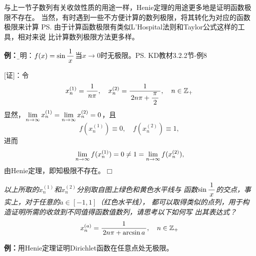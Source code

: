 与上一节子数列有关收敛性质的用途一样，Henie定理的用途更多地是证明函数极限不存在。
当然，有时遇到一些不方便计算的数列极限，将其转化为对应的函数极限来计算
\ps{由于计算函数极限有类似L'Hospital法则和Taylor公式这样的工具，相对来说
比计算数列极限方法更多样}。

{\bf 例：}{\b 证明：$f(x)=\sin\displaystyle\frac{\,{1}\,}{\,{x}\,}$当$x\to 0$时无极限。}\ps{KD教材3.2.2节-例8}

[证]：令
$$x^{(1)}_n=\displaystyle\frac{\,{1}\,}{\,{n\pi}\,},\quad
x^{(2)}_n=\displaystyle\frac{\,{1}\,}{\,{2n\pi+\displaystyle\frac{\,{\pi}\,}{\,{2}\,}}\,},\quad n\in\mathbb{Z}_+$$ 
显然，$\lim\limits_{n\to\infty} x^{(1)}_n=\lim\limits_{n\to\infty} x^{(2)}_n=0$，且
$$f(x^{(1)}_n)\equiv0,\quad f(x^{(2)}_n)\equiv1,$$
进而
$$\lim\limits_{n\to\infty} f(x^{(1)}_n)=0\ne1=\lim\limits_{n\to\infty} f(x^{(2)}_n),$$
由Henie定理，即知极限不存在。\hfill $\Box$

\begin{center}
	
	{\it 以上所取的$x^{(1)}_n$和$x^{(2)}_n$分别取自图上绿色和黄色水平线与
	函数$\sin\displaystyle\frac{\,{1}\,}{\,{x}\,}$的交点，事实上，对于任意的$a\in[-1,1]$（红色水平线），
	都可以取得类似的点列，用于构造证明所需的收敛到不同值得函数值数列，请思考以下如何写
	出其表达式？
	$$x^{(a)}_n=\displaystyle\frac{\,{1}\,}{\,{2n\pi+\arcsin a}\,},\quad n\in\mathbb{Z}_+$$}
\end{center}

	{\bf 例：}用Henie定理证明Dirichlet函数在任意点处无极限。
	
% 	
	
